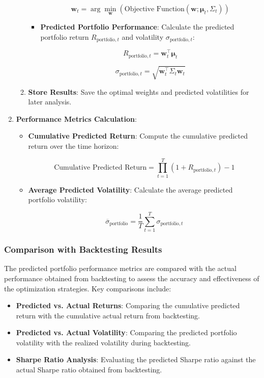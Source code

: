 \begin{enumerate}
\begin{enumerate}
\begin{itemize}
            \[
            \mathbf{w}_t = \arg\min_{\mathbf{w}} \left( \text{Objective Function}(\mathbf{w}; \boldsymbol{\mu}_t, \Sigma_t) \right)
            \]

            \item \textbf{Predicted Portfolio Performance}: Calculate the predicted portfolio return \( R_{\text{portfolio}, t} \) and volatility \( \sigma_{\text{portfolio}, t} \):

            \[
            R_{\text{portfolio}, t} = \mathbf{w}_t^\top \boldsymbol{\mu}_t
            \]

            \[
            \sigma_{\text{portfolio}, t} = \sqrt{\mathbf{w}_t^\top \Sigma_t \mathbf{w}_t}
            \]
        \end{itemize}
        \item \textbf{Store Results}: Save the optimal weights and predicted volatilities for later analysis.
    \end{enumerate}
    \item \textbf{Performance Metrics Calculation}:
    \begin{itemize}
        \item \textbf{Cumulative Predicted Return}: Compute the cumulative predicted return over the time horizon:

        \[
        \text{Cumulative Predicted Return} = \prod_{t=1}^T (1 + R_{\text{portfolio}, t}) - 1
        \]

        \item \textbf{Average Predicted Volatility}: Calculate the average predicted portfolio volatility:

        \[
        \overline{\sigma}_{\text{portfolio}} = \frac{1}{T} \sum_{t=1}^T \sigma_{\text{portfolio}, t}
        \]
    \end{itemize}
\end{enumerate}

\subsubsection{Comparison with Backtesting Results}

The predicted portfolio performance metrics are compared with the actual performance obtained from backtesting to assess the accuracy and effectiveness of the optimization strategies. Key comparisons include:

\begin{itemize}
    \item \textbf{Predicted vs. Actual Returns}: Comparing the cumulative predicted return with the cumulative actual return from backtesting.
    \item \textbf{Predicted vs. Actual Volatility}: Comparing the predicted portfolio volatility with the realized volatility during backtesting.
    \item \textbf{Sharpe Ratio Analysis}: Evaluating the predicted Sharpe ratio against the actual Sharpe ratio obtained from backtesting.
\end{itemize}

